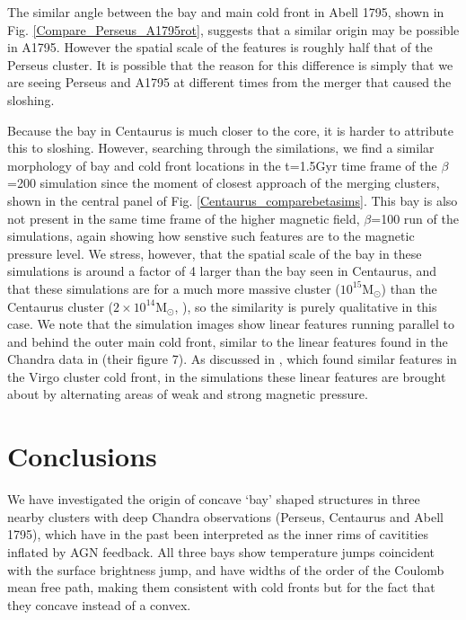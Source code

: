 \documentclass[useAMS,usenatbib]{mn2e}
\begin{document}
The similar angle between the bay and main cold front in Abell 1795, shown in Fig. \ref{Compare_Perseus_A1795rot}, suggests that
a similar origin may be possible in A1795. However the spatial scale of the features is roughly half that of the Perseus cluster.
It is possible that the reason for this difference is simply that we are seeing Perseus and A1795 at different 
times from the merger that caused the sloshing.

Because the bay in Centaurus is much closer to the core, it is harder to attribute this to sloshing. However, searching 
through the similations, we find a similar morphology of bay and cold front locations in the t=1.5Gyr time frame 
of the $\beta$=200 simulation since the moment of closest approach of the merging clusters, shown in the central panel of Fig. \ref{Centaurus_comparebetasims}. This bay is also not present in the 
same time frame of the higher magnetic field, $\beta$=100 run of the simulations, again showing how senstive such features are to the magnetic pressure level. We stress, however, that the spatial scale of the bay in 
these simulations is around a factor of 4 larger than the bay seen in Centaurus, and that these simulations are for a much more massive cluster ($10^{15}$M$_{\odot}$) 
than the Centaurus cluster ($2\times10^{14}$M$_{\odot}$, \citealt{Walker2013_Centaurus}), so the similarity is purely qualitative in this case. We note 
that the simulation images show linear features running parallel to and behind the outer main cold front, similar to the linear features found in the
Chandra data in \citet{Sanders2016} (their figure 7). As discussed in \citet{Werner2016}, which found similar features in the Virgo cluster cold front, 
in the simulations these linear features are brought about by alternating areas of weak and strong magnetic pressure.











\section{Conclusions}
\label{sec:conclusions}
We have investigated the origin of concave `bay' shaped structures in three
nearby clusters with deep Chandra observations (Perseus, Centaurus and Abell
1795), which have in the past been interpreted as the inner rims of cavitities
inflated by AGN feedback. All three bays show temperature jumps coincident with
the surface brightness jump, and have widths of the order of the Coulomb mean free
path, making them consistent with cold fronts but for the fact that they concave instead of a convex. 
\end{document}
